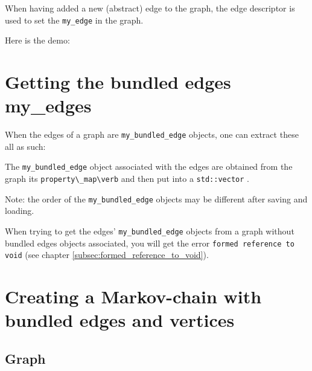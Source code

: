 

When having added a new (abstract) edge to the graph, the edge descriptor
is used to set the \verb;my_edge; in the graph.

Here is the demo:



\section{Getting the bundled edges my\_edges}
\label{subsec:get_bundled_edge_my_edges}

When the edges of a graph are \verb;my_bundled_edge; objects, 
one can extract these all as such:



The \verb;my_bundled_edge; object associated with the edges are obtained from
the graph its \verb;property\_map\verb; and then put into a 
\verb;std::vector; .

Note: the order of the \verb;my_bundled_edge; objects may be different after saving
and loading.

When trying to get the edges' \verb;my_bundled_edge; objects from a graph without
bundled edges objects associated, you will get the error 
\verb;formed reference to void; (see chapter \ref{subsec:formed_reference_to_void}).

\section{Creating a Markov-chain with bundled edges and vertices}
\label{subsec:create_bundled_edges_and_vertices_markov_chain}

\subsection{Graph}

